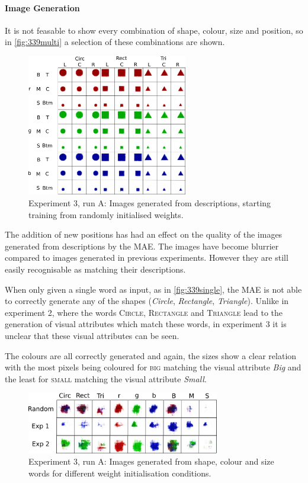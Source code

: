 \paragraph{Image Generation}
It is not feasable to show every combination of shape, colour, size and position, so in \autoref{fig:339multi} a selection of these combinations are shown.

\begin{figure}[h]
\centering
\includegraphics[width=0.625\textwidth]{Figs/shapes/multiword339.png}
\caption{Experiment 3, run A: Images generated from descriptions, starting training from randomly initialised weights.}
\label{fig:339multi}
\end{figure}

The addition of new positions has had an effect on the quality of the images generated from descriptions by the \ac{MAE}. The images have become blurrier compared to images generated in previous experiments. However they are still easily recognisable as matching their descriptions.

When only given a single word as input, as in \autoref{fig:339single}, the MAE is not able to correctly generate any of the shapes (\textit{Circle}, \textit{Rectangle}, \textit{Triangle}). Unlike in experiment 2, where the words \textsc{Circle}, \textsc{Rectangle} and \textsc{Triangle} lead to the generation of visual attributes which match these words, in experiment 3 it is unclear that these visual attributes can be seen.

The colours are all correctly generated and again, the sizes show a clear relation with the most pixels being coloured for \textsc{big} matching the visual attribute \textit{Big} and the least for \textsc{small} matching the visual attribute \textit{Small}.

\begin{figure}[h]
\centering
\includegraphics[width=0.75\textwidth]{Figs/shapes/singlelabel339.png}
\caption{Experiment 3, run A: Images generated from shape, colour and size words for different weight initialisation conditions.}
\label{fig:339single}
\end{figure}

